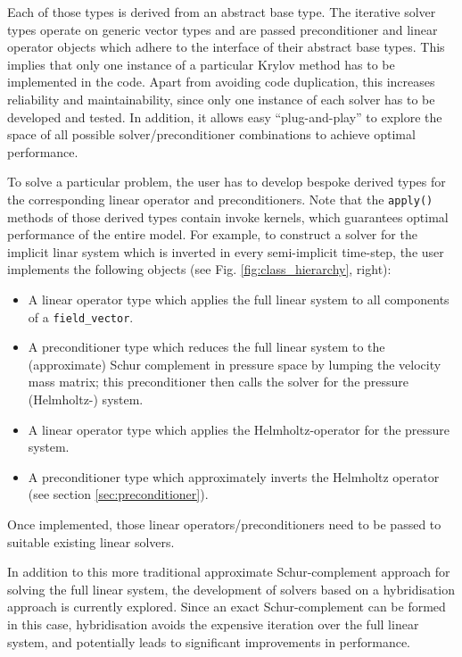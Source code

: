 \documentclass[times]{elsarticle}
\begin{document}
Each of those types is derived from an abstract base type. The
iterative solver types operate on generic vector types and are passed
preconditioner and linear operator objects which adhere to the
interface of their abstract base types.  This implies that only one
instance of a particular Krylov method has to be implemented in the
code. Apart from avoiding code duplication, this increases reliability
and maintainability, since only one instance of each solver has to be
developed and tested. In addition, it allows easy ``plug-and-play'' to
explore the space of all possible solver/preconditioner combinations
to achieve optimal performance.

To solve a particular problem, the user has to develop bespoke derived
types for the corresponding linear operator and preconditioners. Note
that the \texttt{apply()} methods of those derived types contain
invoke kernels, which guarantees optimal performance of the entire
model. For example, to construct a solver for the implicit linar
system which is inverted in every semi-implicit time-step, the user
implements the following objects (see Fig. \ref{fig:class_hierarchy},
right):
\begin{itemize}
\item A linear operator type which applies the full linear system to
  all components of a \texttt{field\_vector}.
\item A preconditioner type which reduces the full linear system to
  the (approximate) Schur complement in pressure space by lumping the
  velocity mass matrix; this preconditioner then calls the solver for
  the pressure (Helmholtz-) system.
\item A linear operator type which applies the Helmholtz-operator for
  the pressure system.
\item A preconditioner type which approximately inverts the Helmholtz
  operator (see section \ref{sec:preconditioner}).
\end{itemize}
Once implemented, those linear operators/preconditioners need to be
passed to suitable existing linear solvers.

In addition to this more traditional approximate Schur-complement
approach for solving the full linear system, the development of
solvers based on a hybridisation approach is currently explored. Since
an exact Schur-complement can be formed in this case, hybridisation
avoids the expensive iteration over the full linear system, and
potentially leads to significant improvements in performance.
\end{document}
